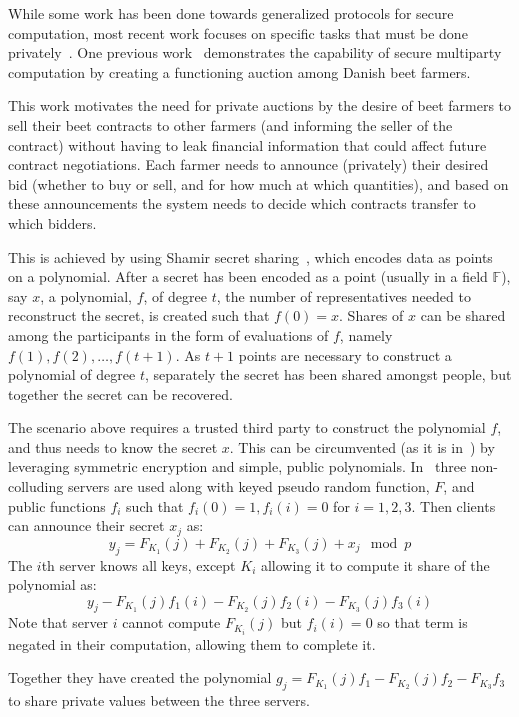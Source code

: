 While some work has been done towards generalized protocols for secure
computation, most recent work focuses on specific tasks that must be done
privately~\cite{bogetoft2009secure,miers2013zerocoin,parno2013pinocchio}. One
previous work~\cite{bogetoft2009secure} demonstrates the capability of secure
multiparty computation by creating a functioning auction among Danish beet
farmers. 

This work motivates the need for private auctions by the desire of beet farmers
to sell their beet contracts to other farmers (and informing the seller of the
contract) without having to leak financial information that could affect future
contract negotiations. Each farmer needs to announce (privately) their desired
bid (whether to buy or sell, and for how much at which quantities), and based on
these announcements the system needs to decide which contracts transfer to which
bidders.

This is achieved by using Shamir secret sharing~\cite{shamir1979share}, which
encodes data as points on a polynomial. After a secret has been encoded as a
point (usually in a field $\mathbb{F}$), say $x$, a polynomial, $f$, of degree
$t$, the number of representatives needed to reconstruct the secret, is created
such that $f(0)= x$. Shares of $x$ can be shared among the participants in the
form of evaluations of $f$, namely $f(1), f(2),\ldots, f(t+1)$. As $t+1$ points
are necessary to construct a polynomial of degree $t$, separately the secret has
been shared amongst people, but together the secret can be recovered.

The scenario above requires a trusted third party to construct the polynomial
$f$, and thus needs to know the secret $x$. This can be circumvented (as it is
in~\cite{bogetoft2009secure}) by leveraging symmetric encryption and simple,
public polynomials. In~\cite{bogetoft2009secure} three non-colluding servers are
used along with keyed pseudo random function, $F$, and public functions $f_i$
such that $f_i(0) = 1, f_i(i) = 0$ for $i=1,2,3$. Then clients can announce
their secret $x_j$ as:
\[
    y_j = F_{K_1}(j) + F_{K_2}(j) + F_{K_3}(j) + x_j \mod p
\]
The $i$th server knows all keys, except $K_i$ allowing it to compute it share of
the polynomial as:
\[
    y_j - F_{K_1}(j)f_1(i) - F_{K_2}(j)f_2(i) - F_{K_3}(j)f_3(i)
\]
Note that server $i$ cannot compute $F_{K_i}(j)$ but $f_i(i) = 0$ so that term
is negated in their computation, allowing them to complete it.

Together they have created the polynomial $g_j = F_{K_1}(j)f_1 - F_{K_2}(j)f_2
- F_{K_3}f_3$ to share private values between the three servers.

